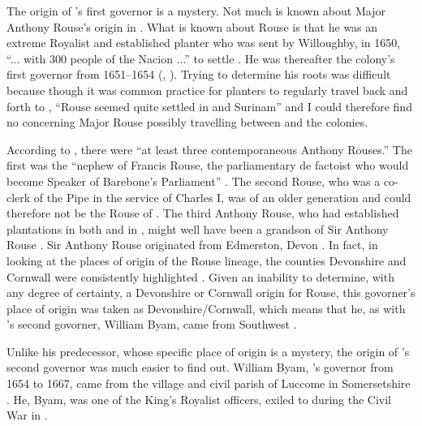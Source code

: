 The origin of 's first governor is a mystery. Not much is known about Major Anthony Rouse's origin in . What is known about Rouse is that he was an extreme Royalist and established  planter who was sent by Willoughby, in 1650, ``... with 300 people of the  Nacion ...'' to settle . He was thereafter the colony's first governor from 1651--1654 (\citealt[198]{Bridenbaugh72}, \citealt[262]{Heywood07}). Trying to determine his  roots was difficult because though it was common practice for planters to regularly travel back and forth to , ``Rouse seemed quite settled in  and Surinam'' \citep{Roper07} and I could therefore find no  concerning Major Rouse possibly travelling between  and the colonies.

According to \citet[195--197]{Roper07}, there were ``at least three contemporaneous Anthony Rouses.'' The first was the ``nephew of Francis Rouse, the parliamentary de factoist who would become Speaker of Barebone's Parliament'' \citep[195]{Roper07}. The second Rouse, who was a co-clerk of the Pipe in the service of Charles I, was of an older generation and could therefore not be the Rouse of  \citep{Roper07}. The third Anthony Rouse, who had established plantations in both  and in \citep{Roper07}, might well have been a grandson of Sir Anthony Rouse \citep{rhs24}. Sir Anthony Rouse originated from Edmerston, Devon \citep{Burke38}. In fact, in looking at the places of origin of the Rouse lineage, the counties Devonshire and Cornwall were consistently highlighted  \citep{Burke38}. Given an inability to determine, with any degree of certainty, a Devonshire or Cornwall origin for Rouse, this govorner's place of origin was taken as Devonshire/Cornwall, which means that he, as with 's second govorner, William Byam, came from Southwest .

Unlike his predecessor, whose specific place of origin is a mystery, the origin of 's second governor was much easier to find out. William Byam, 's governor from 1654 to 1667, came from the village and civil parish of Luccome in Somersetshire \citep{Paravisini96}. He, Byam, was one of the King's Royalist officers, exiled to  during the Civil War in  \citep{Paravisini96}.

